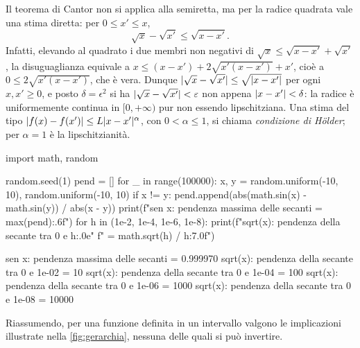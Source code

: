 \begin{esempio}
\label{es:radice-uniforme}
Il teorema di Cantor non si applica alla semiretta, ma per la radice quadrata vale una
stima diretta: per $0\le x'\le x$,
\begin{equation}\label{eq:radice-holder}
  \sqrt x-\sqrt{x'}\le\sqrt{x-x'} .
\end{equation}
Infatti, elevando al quadrato i due membri non negativi di
$\sqrt x\le\sqrt{x-x'}+\sqrt{x'}$, la disuguaglianza equivale a
$x\le(x-x')+2\sqrt{x'(x-x')}+x'$, cioè a $0\le2\sqrt{x'(x-x')}$, che è vera. Dunque
$\lvert \sqrt x-\sqrt{x'}\rvert\le\sqrt{\lvert x-x'\rvert}$ per ogni $x,x'\ge0$, e posto
$\delta=\epsilon^{2}$ si ha $\lvert \sqrt x-\sqrt{x'}\rvert<\varepsilon$ non appena
$\lvert x-x'\rvert<\delta$: la radice è uniformemente continua in $[0,+\infty)$ pur non essendo
lipschitziana. Una stima del tipo $\lvert f(x)-f(x')\rvert\le L\lvert x-x'\rvert^{\alpha}$, con
$0<\alpha\le1$, si chiama \emph{condizione di Hölder}; per $\alpha=1$ è la
lipschitzianità.
\end{esempio}

\begin{python}
import math, random

random.seed(1)
pend = []
for _ in range(100000):
    x, y = random.uniform(-10, 10), random.uniform(-10, 10)
    if x != y:
        pend.append(abs(math.sin(x) - math.sin(y)) / abs(x - y))
print(f"sen x: pendenza massima delle secanti = {max(pend):.6f}")
for h in (1e-2, 1e-4, 1e-6, 1e-8):
    print(f"sqrt(x): pendenza della secante tra 0 e {h:.0e}"
          f" = {math.sqrt(h) / h:7.0f}")
\end{python}
\begin{risultato}
sen x: pendenza massima delle secanti = 0.999970
sqrt(x): pendenza della secante tra 0 e 1e-02 =      10
sqrt(x): pendenza della secante tra 0 e 1e-04 =     100
sqrt(x): pendenza della secante tra 0 e 1e-06 =    1000
sqrt(x): pendenza della secante tra 0 e 1e-08 =   10000
\end{risultato}

Riassumendo, per una funzione definita in un intervallo valgono le implicazioni
illustrate nella \cref{fig:gerarchia}, nessuna delle quali si può invertire.

